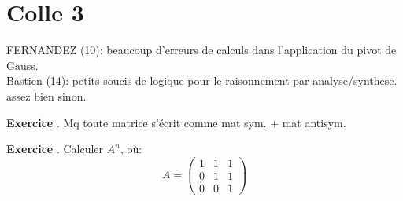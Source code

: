 \documentclass[10pt,a4paper]{article}
\newcounter{question}
\newcounter{exo}
\newenvironment{exo}{\vspace{0.5cm}\setcounter{question}{0}\addtocounter{exo}{1} \noindent \textbf{Exercice \theexo}. \normalsize }{\par}
\begin{document}
	\section*{Colle 3}
	\setcounter{exo}{0}
	FERNANDEZ (10): beaucoup d'erreurs de calculs dans l'application du pivot de Gauss.\\
	Bastien (14): petits soucis de logique pour le raisonnement par analyse/synthese. assez bien sinon.
	\begin{exo}
		Mq toute matrice s'écrit comme mat sym. + mat antisym.
	\end{exo}

	\begin{exo}
		Calculer $A^n$, où:
		$$A = \begin{pmatrix}
		1 & 1 & 1 \\ 
		0 & 1 & 1 \\ 
		0 & 0 & 1
		\end{pmatrix}$$
	\end{exo}
\end{document}
